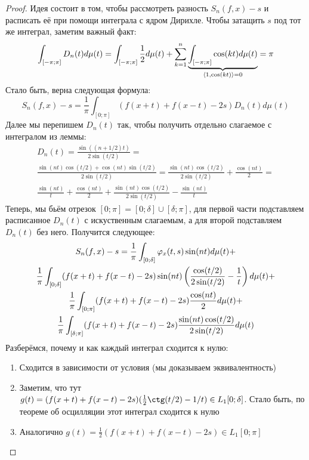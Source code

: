 \begin{proof}
	Идея состоит в том, чтобы рассмотреть разность $S_n(f, x) - s$ и расписать её при помощи интеграла с ядром Дирихле. Чтобы затащить $s$ под тот же интеграл, заметим важный факт:
	\[
		\int_{[-\pi; \pi]} D_n(t)d\mu(t) = \int_{[-\pi; \pi]} \frac{1}{2}d\mu(t) + \sum_{k = 1}^n \underbrace{\int_{[-\pi; \pi]} \cos(kt) d\mu(t)}_{\left\langle1, \cos(kt)\right\rangle = 0} = \pi
	\]
	Стало быть, верна следующая формула:
	\[
		S_n(f, x) - s = \frac{1}{\pi}\int_{[0; \pi]} (f(x + t) + f(x - t) - 2s)D_n(t)d\mu(t)
	\]
	Далее мы перепишем $D_n(t)$ так, чтобы получить отдельно слагаемое с интегралом из леммы:
	\begin{multline*}
		D_n(t) = \frac{\sin((n + 1 / 2)t)}{2\sin(t / 2)} =
		\\
		\frac{\sin(nt)\cos(t / 2) + \cos(nt)\sin(t / 2)}{2\sin(t / 2)} = \frac{\sin(nt)\cos(t / 2)}{2\sin(t / 2)} + \frac{\cos(nt)}{2} =
		\\
		\frac{\sin(nt)}{t} + \frac{\cos(nt)}{2} + \frac{\sin(nt)\cos(t / 2)}{2\sin(t / 2)} - \frac{\sin(nt)}{t}
	\end{multline*}
	Теперь, мы бьём отрезок $[0; \pi] = [0; \delta] \cup [\delta; \pi]$, для первой части подставляем расписанное $D_n(t)$ с искуственным слагаемым, а для второй подставляем $D_n(t)$ без него. Получится следующее:
	\begin{multline*}
		S_n(f, x) - s = \frac{1}{\pi}\int_{[0; \delta]} \varphi_x(t, s)\sin(nt)d\mu(t) +
		\\
		\frac{1}{\pi}\int_{[0; \delta]} (f(x + t) + f(x - t) - 2s) \sin(nt) \left(\frac{\cos(t / 2)}{2\sin(t / 2)} - \frac{1}{t}\right)d\mu(t) +
		\\
		\frac{1}{\pi} \int_{[0; \pi]} (f(x + t) + f(x - t) - 2s)\frac{\cos(nt)}{2}d\mu(t) +
		\\
		\frac{1}{\pi} \int_{[\delta; \pi]} (f(x + t) + f(x - t) - 2s) \frac{\sin(nt)\cos(t / 2)}{2\sin(t / 2)}d\mu(t)
  	\end{multline*}
 	Разберёмся, почему и как каждый интеграл сходится к нулю:
 	\begin{enumerate}
 		\item Сходится в зависимости от условия (мы доказываем эквивалентность)
 		
 		\item Заметим, что тут $g(t) = (f(x + t) + f(x - t) - 2s)(\frac{1}{2}\ctg(t / 2) - 1 / t) \in L_1[0; \delta]$. Стало быть, по теореме об осцилляции этот интеграл сходится к нулю
 		
 		\item Аналогично $g(t) = \frac{1}{2}(f(x + t) + f(x - t) - 2s) \in L_1[0; \pi]$
 		

\end{enumerate}
\end{proof}
